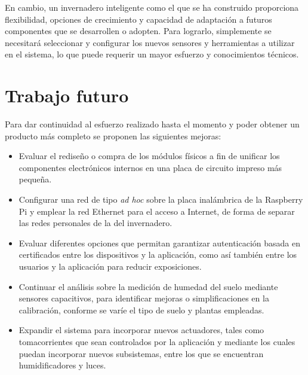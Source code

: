 En cambio, un invernadero inteligente como el que se ha construido proporciona flexibilidad, opciones de crecimiento y capacidad de adaptación a futuros componentes que se desarrollen o adopten. Para lograrlo, simplemente se necesitará seleccionar y configurar los nuevos sensores y herramientas a utilizar en el sistema, lo que puede requerir un mayor esfuerzo y conocimientos técnicos.






\section{Trabajo futuro}

Para dar continuidad al esfuerzo realizado hasta el momento y poder obtener un producto más completo se proponen
 las siguientes mejoras:

\begin{itemize}
\item Evaluar el rediseño o compra de los módulos físicos a fin de unificar los componentes electrónicos internos en una placa de circuito impreso más pequeña. %
 
\item Configurar una red de tipo \textit{ad hoc} sobre la placa inalámbrica de la Raspberry Pi y emplear la red Ethernet para el acceso a Internet, de forma de separar las redes personales de la del invernadero.

\item Evaluar diferentes opciones que permitan garantizar autenticación basada en certificados entre los dispositivos y la aplicación, como así también entre los usuarios y la aplicación para reducir exposiciones.

\item Continuar el análisis sobre la medición de humedad del suelo mediante sensores capacitivos, para identificar mejoras o simplificaciones en la calibración, conforme se varíe el tipo de suelo y plantas empleadas. 

\item Expandir el sistema para incorporar nuevos actuadores, tales como tomacorrientes que sean controlados por la aplicación y mediante los cuales puedan incorporar nuevos subsistemas, entre los que se encuentran humidificadores y luces. 

\end{itemize}